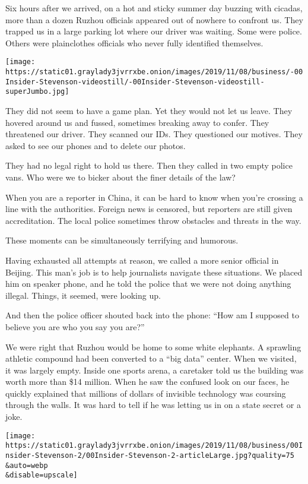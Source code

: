 Six hours after we arrived, on a hot and sticky summer day buzzing with
cicadas, more than a dozen Ruzhou officials appeared out of nowhere to
confront us. They trapped us in a large parking lot where our driver was
waiting. Some were police. Others were plainclothes officials who never
fully identified themselves.

\texttt{[image: https://static01.graylady3jvrrxbe.onion/images/2019/11/08/business/-00Insider-Stevenson-videostill/-00Insider-Stevenson-videostill-superJumbo.jpg]}

They did not seem to have a game plan. Yet they would not let us leave.
They hovered around us and fussed, sometimes breaking away to confer.
They threatened our driver. They scanned our IDs. They questioned our
motives. They asked to see our phones and to delete our photos.

They had no legal right to hold us there. Then they called in two empty
police vans. Who were we to bicker about the finer details of the law?

When you are a reporter in China, it can be hard to know when you're
crossing a line with the authorities. Foreign news is censored, but
reporters are still given accreditation. The local police sometimes
throw obstacles and threats in the way.

These moments can be simultaneously terrifying and humorous.

Having exhausted all attempts at reason, we called a more senior
official in Beijing. This man's job is to help journalists navigate
these situations. We placed him on speaker phone, and he told the police
that we were not doing anything illegal. Things, it seemed, were looking
up.

And then the police officer shouted back into the phone: ``How am I
supposed to believe you are who you say you are?''

We were right that Ruzhou would be home to some white elephants. A
sprawling athletic compound had been converted to a ``big data'' center.
When we visited, it was largely empty. Inside one sports arena, a
caretaker told us the building was worth more than \$14 million. When he
saw the confused look on our faces, he quickly explained that millions
of dollars of invisible technology was coursing through the walls. It
was hard to tell if he was letting us in on a state secret or a joke.

\texttt{[image: https://static01.graylady3jvrrxbe.onion/images/2019/11/08/business/00Insider-Stevenson-2/00Insider-Stevenson-2-articleLarge.jpg?quality=75\\\&auto=webp\\\&disable=upscale]}

